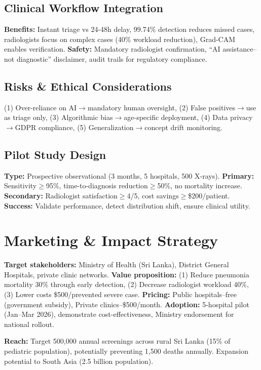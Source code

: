 \documentclass[12pt,a4paper]{article}
\begin{document}
\subsection{Clinical Workflow Integration}
\textbf{Benefits:} Instant triage vs 24-48h delay, 99.74\% detection reduces missed cases, radiologists focus on complex cases (40\% workload reduction), Grad-CAM enables verification. \textbf{Safety:} Mandatory radiologist confirmation, ``AI assistance--not diagnostic'' disclaimer, audit trails for regulatory compliance.

\subsection{Risks \& Ethical Considerations}
(1) Over-reliance on AI$\rightarrow$mandatory human oversight, (2) False positives$\rightarrow$use as triage only, (3) Algorithmic bias$\rightarrow$age-specific deployment, (4) Data privacy$\rightarrow$GDPR compliance, (5) Generalization$\rightarrow$concept drift monitoring.

\subsection{Pilot Study Design}
\textbf{Type:} Prospective observational (3 months, 5 hospitals, 500 X-rays). \textbf{Primary:} Sensitivity$\geq$95\%, time-to-diagnosis reduction$\geq$50\%, no mortality increase. \textbf{Secondary:} Radiologist satisfaction$\geq$4/5, cost savings$\geq$\$200/patient. \textbf{Success:} Validate performance, detect distribution shift, ensure clinical utility.

\section{Marketing \& Impact Strategy}

\textbf{Target stakeholders:} Ministry of Health (Sri Lanka), District General Hospitals, private clinic networks. \textbf{Value proposition:} (1) Reduce pneumonia mortality 30\% through early detection, (2) Decrease radiologist workload 40\%, (3) Lower costs \$500/prevented severe case. \textbf{Pricing:} Public hospitals--free (government subsidy), Private clinics--\$500/month. \textbf{Adoption:} 5-hospital pilot (Jan--Mar 2026), demonstrate cost-effectiveness, Ministry endorsement for national rollout.

\textbf{Reach:} Target 500,000 annual screenings across rural Sri Lanka (15\% of pediatric population), potentially preventing 1,500 deaths annually. Expansion potential to South Asia (2.5 billion population).
\end{document}
